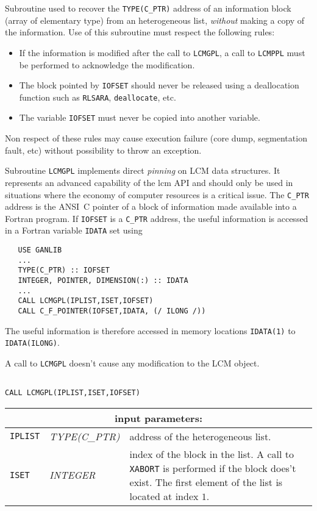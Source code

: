 Subroutine used to recover the {\tt TYPE(C\_PTR)} address of an information block (array of elementary type) from an heterogeneous list,
{\sl without} making a copy of the information. Use of this subroutine must respect the following rules:
\begin{itemize}
\item If the information is modified after the call to {\tt LCMGPL}, a call to {\tt LCMPPL} 
must be performed to acknowledge the modification.
\item The block pointed by {\tt IOFSET} should never be released using a deallocation function such as
{\tt RLSARA}, {\tt deallocate}, etc.
\item The variable {\tt IOFSET} must never be copied into another variable.
\end{itemize}
Non respect of these rules may cause execution failure (core dump,
segmentation fault, etc) without possibility to throw an exception.

\vskip 0.2cm

Subroutine {\tt LCMGPL} implements direct {\sl pinning} on LCM data structures. It represents an advanced capability of the {\sc lcm} API and should only be used in situations where
the economy of computer resources is a critical issue. The {\tt C\_PTR} address is the ANSI~C pointer of a block of
information made available into a Fortran program. If {\tt IOFSET} is a {\tt C\_PTR} address, the useful information is
accessed in a Fortran variable {\tt IDATA} set using
\begin{verbatim}
   USE GANLIB
   ...
   TYPE(C_PTR) :: IOFSET
   INTEGER, POINTER, DIMENSION(:) :: IDATA
   ...
   CALL LCMGPL(IPLIST,ISET,IOFSET)
   CALL C_F_POINTER(IOFSET,IDATA, (/ ILONG /))
\end{verbatim}

The useful information is therefore accessed in memory locations {\tt IDATA(1)} to {\tt IDATA(ILONG)}.

\vskip 0.2cm

A call to {\tt LCMGPL} doesn't cause any modification to the LCM object.

\begin{verbatim}

CALL LCMGPL(IPLIST,ISET,IOFSET)
\end{verbatim}

\noindent
\begin{tabular}{|p{1.5cm}|p{3cm}|p{10cm}|}
\hline
\multicolumn{3}{|c|}{\bf input parameters:} \\
\hline
{\tt IPLIST} & {\it TYPE(C\_PTR)} & address of the heterogeneous list. \\
\hline
{\tt ISET} & {\it INTEGER} & index of the block in the list.
A call to {\tt XABORT} is performed if the block does't exist.
The first element of the list is located at index $1$. \\
\hline
\end{tabular}

